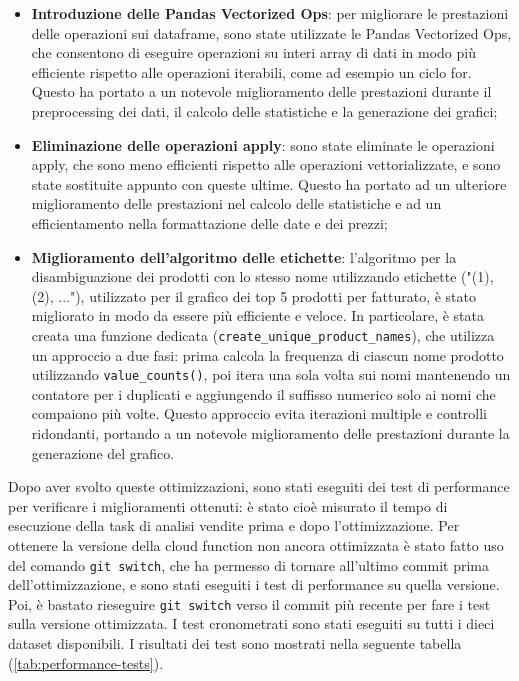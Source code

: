 \begin{itemize}
    \item \textbf{Introduzione delle Pandas Vectorized Ops}: per migliorare le prestazioni delle operazioni sui dataframe, sono state utilizzate le Pandas Vectorized Ops, che consentono di eseguire operazioni su interi array di dati in modo più efficiente rispetto alle operazioni iterabili, come ad esempio un ciclo for. Questo ha portato a un notevole miglioramento delle prestazioni durante il preprocessing dei dati, il calcolo delle statistiche e la generazione dei grafici;
    \item \textbf{Eliminazione delle operazioni apply}: sono state eliminate le operazioni apply, che sono meno efficienti rispetto alle operazioni vettorializzate, e sono state sostituite appunto con queste ultime. Questo ha portato ad un ulteriore miglioramento delle prestazioni nel calcolo delle statistiche e ad un efficientamento nella formattazione delle date e dei prezzi;
    \item \textbf{Miglioramento dell'algoritmo delle etichette}: l'algoritmo per la disambiguazione dei prodotti con lo stesso nome utilizzando etichette ("(1), (2), ..."), utilizzato per il grafico dei top 5 prodotti per fatturato, è stato migliorato in modo da essere più efficiente e veloce. In particolare, è stata creata una funzione dedicata (\texttt{create\_unique\_product\_names}), che utilizza un approccio a due fasi: prima calcola la frequenza di ciascun nome prodotto utilizzando \texttt{value\_counts()}, poi itera una sola volta sui nomi mantenendo un contatore per i duplicati e aggiungendo il suffisso numerico solo ai nomi che compaiono più volte. Questo approccio evita iterazioni multiple e controlli ridondanti, portando a un notevole miglioramento delle prestazioni durante la generazione del grafico.
\end{itemize}

Dopo aver svolto queste ottimizzazioni, sono stati eseguiti dei test di performance per verificare i miglioramenti ottenuti: è stato cioè misurato il tempo di esecuzione della task di analisi vendite prima e dopo l'ottimizzazione. Per ottenere la versione della cloud function non ancora ottimizzata è stato fatto uso del comando \texttt{git switch}, che ha permesso di tornare all'ultimo commit prima dell'ottimizzazione, e sono stati eseguiti i test di performance su quella versione. Poi, è bastato rieseguire \texttt{git switch} verso il commit più recente per fare i test sulla versione ottimizzata. I test cronometrati sono stati eseguiti su tutti i dieci dataset disponibili.
I risultati dei test sono mostrati nella seguente tabella (\ref{tab:performance-tests}).

